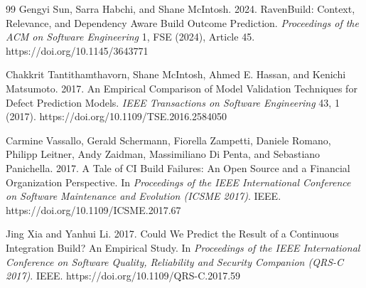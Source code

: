 \documentclass[sigconf,review,anonymous,nonacm]{acmart}
\begin{document}
\begin{thebibliography}{99}
Gengyi Sun, Sarra Habchi, and Shane McIntosh. 2024.
RavenBuild: Context, Relevance, and Dependency Aware Build Outcome Prediction.
\textit{Proceedings of the ACM on Software Engineering} 1, FSE (2024), Article 45. https://doi.org/10.1145/3643771

Chakkrit Tantithamthavorn, Shane McIntosh, Ahmed E. Hassan, and Kenichi Matsumoto. 2017.
An Empirical Comparison of Model Validation Techniques for Defect Prediction Models.
\textit{IEEE Transactions on Software Engineering} 43, 1 (2017). https://doi.org/10.1109/TSE.2016.2584050

Carmine Vassallo, Gerald Schermann, Fiorella Zampetti, Daniele Romano, Philipp Leitner, Andy Zaidman, Massimiliano Di Penta, and Sebastiano Panichella. 2017.
A Tale of CI Build Failures: An Open Source and a Financial Organization Perspective.
In \textit{Proceedings of the IEEE International Conference on Software Maintenance and Evolution (ICSME 2017)}. IEEE. https://doi.org/10.1109/ICSME.2017.67

Jing Xia and Yanhui Li. 2017.
Could We Predict the Result of a Continuous Integration Build? An Empirical Study.
In \textit{Proceedings of the IEEE International Conference on Software Quality, Reliability and Security Companion (QRS-C 2017)}. IEEE. https://doi.org/10.1109/QRS-C.2017.59

\end{thebibliography}
\end{document}
